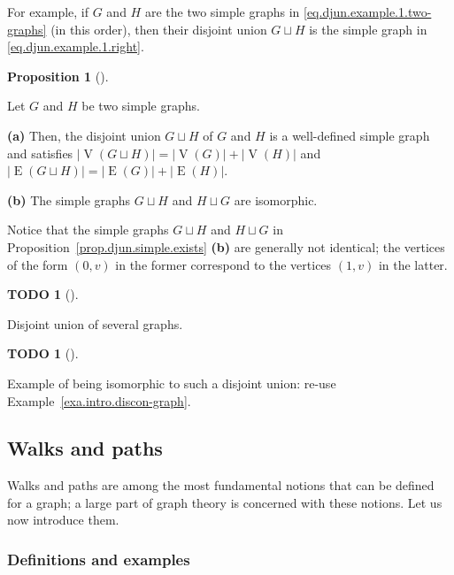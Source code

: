 \documentclass[numbers=enddot,12pt,final,onecolumn,notitlepage]{scrartcl}%
\theoremstyle{definition}
\newtheorem{prop}[theo]{Proposition}
\newenvironment{proposition}[1][]
{\begin{prop}[#1]\begin{leftbar}}
{\end{leftbar}\end{prop}}
\newtheorem{quest}[theo]{TODO}
\newenvironment{todo}[1][]
{\begin{quest}[#1]\begin{leftbar}}
{\end{leftbar}\end{quest}}
\newcommand{\abs}[1]{\left| #1 \right|}
\newcommand{\tup}[1]{\left( #1 \right)}
\newcommand{\verts}[1]{\operatorname{V}\left( #1 \right)}
\newcommand{\edges}[1]{\operatorname{E}\left( #1 \right)}
\begin{document}
For example, if $G$ and $H$ are the two simple graphs
in \eqref{eq.djun.example.1.two-graphs} (in this order),
then their disjoint union $G \sqcup H$ is the simple graph
in \eqref{eq.djun.example.1.right}.

\begin{proposition}
\label{prop.djun.simple.exists}
Let $G$ and $H$ be two simple graphs.

\textbf{(a)}
Then, the disjoint union $G \sqcup H$ of $G$ and $H$ is a
well-defined simple graph and satisfies
$\abs{\verts{G \sqcup H}} = \abs{\verts{G}} + \abs{\verts{H}}$
and
$\abs{\edges{G \sqcup H}} = \abs{\edges{G}} + \abs{\edges{H}}$.

\textbf{(b)}
The simple graphs $G \sqcup H$ and $H \sqcup G$ are
isomorphic.
\end{proposition}

Notice that the simple graphs
$G \sqcup H$ and $H \sqcup G$ in
Proposition~\ref{prop.djun.simple.exists} \textbf{(b)}
are generally not identical; the vertices of the form
$\tup{0, v}$ in the former correspond to the vertices
$\tup{1, v}$ in the latter.

\begin{todo}
Disjoint union of several graphs.
\end{todo}

\begin{todo}
Example of being isomorphic to such a disjoint union:
re-use Example~\ref{exa.intro.discon-graph}.
\end{todo}


\subsection{\label{sect.intro.walks}Walks and paths}

Walks and paths are among the most fundamental notions that can be
defined for a graph; a large part of graph theory is concerned with
these notions. Let us now introduce them.

\subsubsection{Definitions and examples}
\end{document}
